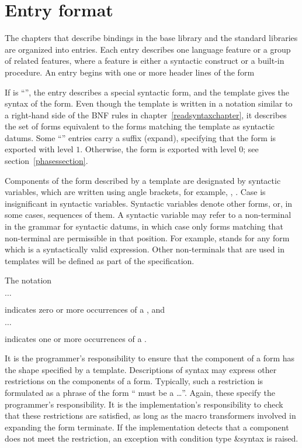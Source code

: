 \section{Entry format}
\label{entryformatsection}

The chapters that describe bindings in the base library and the standard
libraries are organized
into entries.  Each entry describes one language feature or a group of
related features, where a feature is either a syntactic construct or a
built-in procedure.  An entry begins with one or more header lines of the form

\noindent{}\unpenalty

If  is ``\exprtype'', the entry describes a 
special syntactic form, and the template gives the syntax of the form.  Even
though the template is written in a notation similar to a right-hand
side of the BNF rules in chapter~\ref{readsyntaxchapter}, it describes
the set of forms equivalent to the forms matching the
template as syntactic datums.  Some ``\exprtype'' entries carry a
suffix ({\cf expand}), specifying that the form is exported with level
$1$.  Otherwise, the form is exported with level $0$; see
section~\ref{phasessection}.

Components of the form described by a template are designated
by syntactic variables, which are written using angle brackets, for
example, , .  Case is insignificant
in syntactic variables.  Syntactic variables
denote other forms, or, in some cases,
sequences of them.  A syntactic variable may refer to a non-terminal
in the grammar for syntactic datums, in which case only forms matching
that non-terminal are permissible in that position.  For example,
 stands for any form which is a
syntactically valid expression.  Other non-terminals that are used in
templates will be defined as part of the specification.

The notation
\begin{tabbing}
\qquad {} $\ldots$
\end{tabbing}
indicates zero or more occurrences of a , and
\begin{tabbing}
\qquad {}  $\ldots$
\end{tabbing}
indicates one or more occurrences of a .

It is the programmer's responsibility to ensure that the component of
a form has the shape specified by a template.  Descriptions of syntax
may express other restrictions on the components of a form.
Typically, such a restriction is formulated as a phrase of the form
`` must be a \ldots''.  Again, these
specify the programmer's responsibility.  It is the implementation's
responsibility to check that these restrictions are satisfied, as long
as the macro transformers involved in expanding the form terminate.
If the implementation detects that a component does not meet the
restriction, an exception with condition type {\cf\&syntax} is raised.

